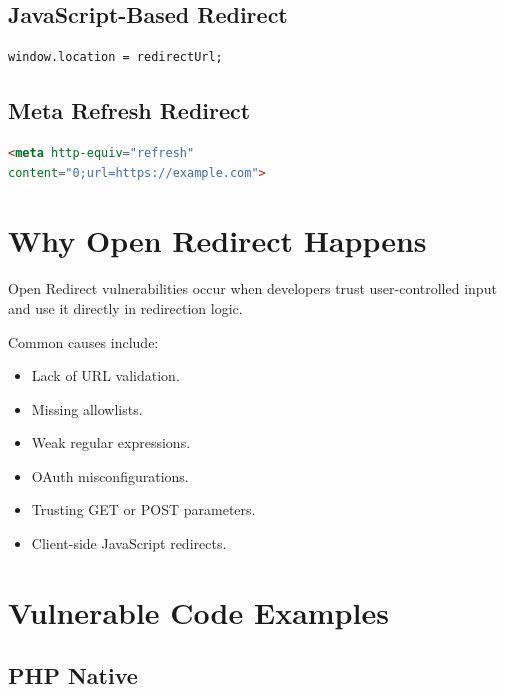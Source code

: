 \documentclass{article}
\begin{document}
\subsection{JavaScript-Based Redirect}

\begin{lstlisting}
window.location = redirectUrl;
\end{lstlisting}

\subsection{Meta Refresh Redirect}

\begin{lstlisting}[language=HTML] <meta http-equiv="refresh"
content="0;url=https://example.com">
\end{lstlisting}


\section{Why Open Redirect Happens}

Open Redirect vulnerabilities occur when developers trust user-controlled input and use it directly in redirection logic.

Common causes include:

\begin{itemize}
\item Lack of URL validation.
\item Missing allowlists.
\item Weak regular expressions.
\item OAuth misconfigurations.
\item Trusting GET or POST parameters.
\item Client-side JavaScript redirects.
\end{itemize}


\section{Vulnerable Code Examples}

\subsection{PHP Native}
\end{document}
